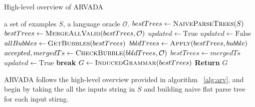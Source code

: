 \begin{algorithm}[H]
\caption{High-level overview of ARVADA \cite{kulkarniLearningHighlyRecursive2021}}\label{alg:arv}
\begin{algorithmic}[1]
    \Require a set of examples $S$, a language oracle $\mathcal{O}$.
    \State $bestTrees \gets \textsc{NaiveParseTrees}(S)$
    \State $bestTrees \gets \textsc{MergeAllValid}(bestTrees, \mathcal{O})$
    \State $updated \gets \text{True}$
        \State $updated \gets \text{False}$
        \State $allBubbles \gets \textsc{GetBubbles}(bestTrees)$
            \State $bbldTrees \gets \textsc{Apply}(bestTrees, bubble)$
            \State $accepted, mergedTs \gets \textsc{CheckBubble}(bbldTrees, \mathcal{O})$
                \State $bestTrees \gets mergedTs$
                \State $updated \gets \text{True}$
                \State \textbf{break}
            \EndIf
        \EndFor
    \EndWhile
    \State $G \gets \textsc{InducedGrammar}(bestTrees)$
    \State \textbf{Return} $G$
\end{algorithmic}
\end{algorithm}

ARVADA follows the high-level overview provided in algorithm ~\ref{alg:arv}, and begin by taking the all the inputs string in $S$ and building naive flat parse tree for each input stirng.

